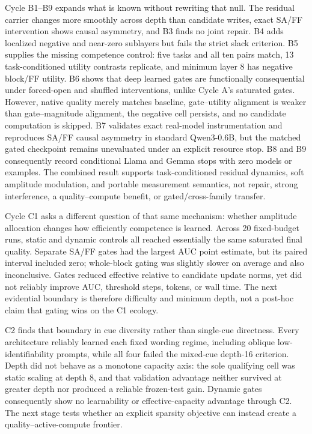 \documentclass[10pt]{article}
\begin{document}
Cycle B1--B9 expands what is known without rewriting that null. The residual carrier changes more smoothly across depth than candidate writes, exact SA/FF intervention shows causal asymmetry, and B3 finds no joint repair. B4 adds localized negative and near-zero sublayers but fails the strict slack criterion. B5 supplies the missing competence control: five tasks and all ten pairs match, 13 task-conditioned utility contrasts replicate, and minimum layer 8 has negative block/FF utility. B6 shows that deep learned gates are functionally consequential under forced-open and shuffled interventions, unlike Cycle A's saturated gates. However, native quality merely matches baseline, gate--utility alignment is weaker than gate--magnitude alignment, the negative cell persists, and no candidate computation is skipped. B7 validates exact real-model instrumentation and reproduces SA/FF causal asymmetry in standard Qwen3-0.6B, but the matched gated checkpoint remains unevaluated under an explicit resource stop. B8 and B9 consequently record conditional Llama and Gemma stops with zero models or examples. The combined result supports task-conditioned residual dynamics, soft amplitude modulation, and portable measurement semantics, not repair, strong interference, a quality--compute benefit, or gated/cross-family transfer.

Cycle C1 asks a different question of that same mechanism: whether amplitude allocation changes how efficiently competence is learned. Across 20 fixed-budget runs, static and dynamic controls all reached essentially the same saturated final quality. Separate SA/FF gates had the largest AUC point estimate, but its paired interval included zero; whole-block gating was slightly slower on average and also inconclusive. Gates reduced effective relative to candidate update norms, yet did not reliably improve AUC, threshold steps, tokens, or wall time. The next evidential boundary is therefore difficulty and minimum depth, not a post-hoc claim that gating wins on the C1 ecology.

C2 finds that boundary in cue diversity rather than single-cue directness. Every architecture reliably learned each fixed wording regime, including oblique low-identifiability prompts, while all four failed the mixed-cue depth-16 criterion. Depth did not behave as a monotone capacity axis: the sole qualifying cell was static scaling at depth 8, and that validation advantage neither survived at greater depth nor produced a reliable frozen-test gain. Dynamic gates consequently show no learnability or effective-capacity advantage through C2. The next stage tests whether an explicit sparsity objective can instead create a quality--active-compute frontier.
\end{document}
